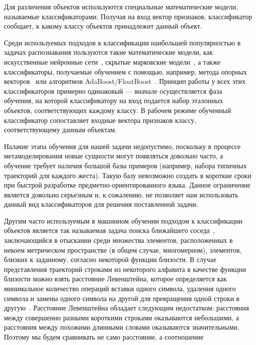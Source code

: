 \documentclass[a5paper]{article}
\begin{document}
Для различения объектов используются специальные математические модели, называемые классификаторами. Получая на вход вектор признаков,
классификатор сообщает, к какому классу объектов принадлежит данный объект. 

Среди используемых подходов к классификации наибольшей популярностью в задачах распознавания пользуются 
такие математические модели, как искусственные нейронные сети~\cite{neuronet1, neuronet2, neuronet3}, 
скрытые марковские модели~\cite{hmm1, hmm2, hmm3}, а также классификаторы, получаемые обучением с помощью, например, 
метода опорных векторов~\cite{svm1, svm2} или алгоритмов AdaBoost/FloatBoost~\cite{boosting1, boosting2}.
Принцип работы у всех этих классификаторов примерно одинаковый --- вначале осуществляется фаза обучения, на которой классификатору на вход
подается набор эталонных объектов, соответствующих каждому классу. В рабочем режиме обученный классификатор сопоставляет входные вектора 
признаков классу, соответствующему данным объектам.

Налачие этапа обучения для нашей задачи недопустимо, поскольку в процессе метамоделирования новые сущности могут появляться
довольно часто, а обучение требует наличия большой базы примеров (например, набора типичных траекторий для каждого жеста). Такую
базу невозможно создать в короткие сроки при быстрой разработке предметно-ориентированного языка. 
Данное ограничение является довольно серьезным и, к сожалению, не позволяет нам использовать данный вид классификаторов для решения 
поставленной задачи.

Другим часто используемым в машинном обучении подходом к классификации объектов является так называемая задача поиска ближайшего 
соседа~\cite{nns1, nns2}, заключающийся в отыскании среди множества элементов, расположенных в некоем метрическом пространстве (в 
общем случае, многомерном), элементов, близких к заданному, согласно некоторой функции близости. 
В случае представления траекторий строками из некоторого алфавита в качестве функции близости можно взять расстояние Левенштейна, 
которое определяется как минимальное количество операций вставки одного символа, удаления одного символа и замены 
одного символа на другой для превращения одной строки в другую~\cite{levenshtein}. Расстояние Левенштейна обладает следующим недостатком:
расстояния между совершенно разными короткими строками оказываются небольшими, а расстояния между похожими длинными словами 
оказываются значительными. Поэтому мы будем сравнивать не само расстояние, а соотношение 
\end{document}

